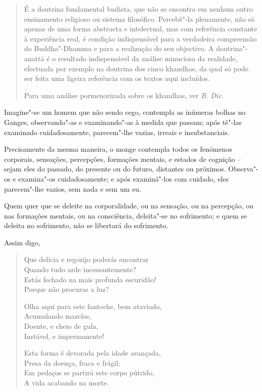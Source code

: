 \begin{quote}
  É a doutrina fundamental budista, que não se encontra em nenhum outro
  ensinamento religioso ou sistema filosófico. Percebê"-la plenamente, não só
  apenas de uma forma abstracta e intelectual, mas com referência constante à
  experiência real, é condição indispensável para a verdadeira compreensão do
  Buddha"-Dhamma e para a realização do seu objectivo. A doutrina"-anattā é o
  resultado indispensável da análise minuciosa da realidade, efectuada por
  exemplo na doutrina dos cinco khandhas, da qual só pode ser feita uma ligeira
  referência com os textos aqui incluídos.

  Para uma análise pormenorizada sobre os khandhas, ver \emph{B. Dic}.
\end{quote}

Imagine"-se um homem que não sendo cego, contempla as inúmeras bolhas no Ganges,
observando"-as e examinando"-as à medida que passam; após tê"-las examinado
cuidadosamente, parecem"-lhe vazias, irreais e insubstanciais.

Precisamente da mesma maneira, o monge contempla todos os fenómenos corporais,
sensações, percepções, formações mentais, e estados de cognição -- sejam eles do
passado, do presente ou do futuro, distantes ou próximos. Observa"-os e
examina"-os cuidadosamente; e após examiná"-los com cuidado, eles parecem"-lhe
vazios, sem nada e sem um eu.


Quem quer que se deleite na corporalidade, ou na sensação, ou na percepção, ou
nas formações mentais, ou na consciência, deleita"-se no sofrimento; e quem se
deleita no sofrimento, não se libertará do sofrimento.


\clearpage

Assim digo,

\begin{verse}
Que delícia e regozijo poderás encontrar\\
Quando tudo arde incessantemente?\\
Estás fechado na mais profunda escuridão!\\
Porque não procuras a luz?

Olha aqui para este fantoche, bem ataviado,\\
Acumulando mazelas,\\
Doente, e cheio de gula,\\
Instável, e impermanente!

Esta forma é devorada pela idade avançada,\\
Presa da doença, fraca e frágil;\\
Em pedaços se partirá este corpo pútrido,\\
A vida acabando na morte.
\end{verse}

